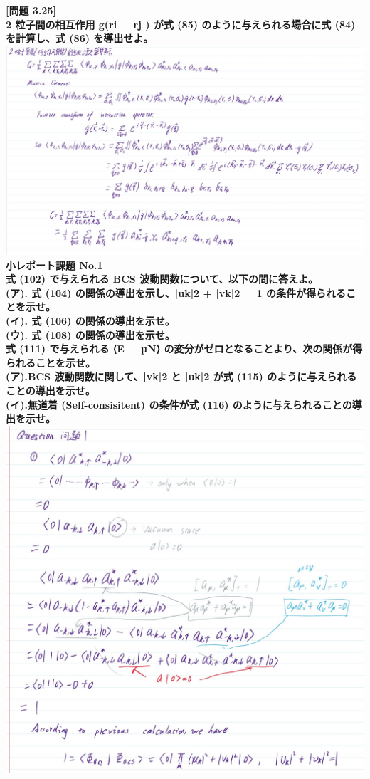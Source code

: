 \documentclass[11pt,largemargins]{homework}
\begin{document}
\newpage
\question
\textbf{[問題 3.25]\\2 粒子間の相互作用 g(ri − rj ) が式 (85) のように与えられる場合に式 (84) を計算し、式 (86) を導出せよ。}\\
\includegraphics[scale=0.6]{Question/Q3.25.jpg}
\newpage
\question\textbf{小レポート課題 No.1\\
[問題 1]式 (102) で与えられる BCS 波動関数について、以下の問に答えよ。\\
(ア). 式 (104) の関係の導出を示し、|uk|2 + |vk|2 = 1 の条件が得られることを示せ。\\
(イ). 式 (106) の関係の導出を示せ。\\
(ウ). 式 (108) の関係の導出を示せ。\\
[問題2]式 (111) で与えられる ⟨E − µN⟩ の変分がゼロとなることより、次の関係が得られることを示せ。\\
(ア).BCS 波動関数に関して、|vk|2 と |uk|2 が式 (115) のように与えられることの導出を示せ。\\
(イ).無道着 (Self-consisitent) の条件が式 (116) のように与えられることの導出を示せ。}\\
\newpage
\includegraphics[scale=0.57]{Question/Task1-1.jpg}\\
\end{document}
